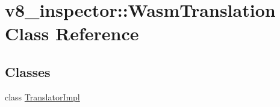 \hypertarget{classv8__inspector_1_1WasmTranslation}{}\section{v8\+\_\+inspector\+:\+:Wasm\+Translation Class Reference}
\label{classv8__inspector_1_1WasmTranslation}
\subsection*{Classes}
\begin{DoxyCompactItemize}
\item 
class \mbox{\hyperlink{classv8__inspector_1_1WasmTranslation_1_1TranslatorImpl}{Translator\+Impl}}
\end{DoxyCompactItemize}
